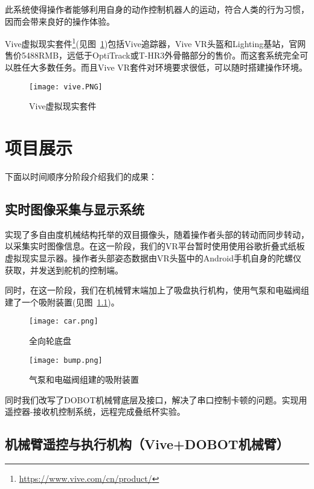此系统使得操作者能够利用自身的动作控制机器人的运动，符合人类的行为习惯，因而会带来良好的操作体验。

Vive虚拟现实套件\footnote{\url{https://www.vive.com/cn/product/}}(见图~\ref{vivekit})包括Vive追踪器，Vive VR头盔和Lighting基站，官网售价5488RMB，远低于OptiTrack或T-HR3外骨骼部分的售价。而这套系统完全可以胜任大多数任务。而且Vive VR套件对环境要求很低，可以随时搭建操作环境。
\begin{figure}[H]
\small
\centering
\texttt{[image: vive.PNG]}
\caption{Vive虚拟现实套件} 
\label{vivekit}
\end{figure}




\chapter{项目展示}
下面以时间顺序分阶段介绍我们的成果：

\section{实时图像采集与显示系统}
实现了多自由度机械结构托举的双目摄像头，随着操作者头部的转动而同步转动，以采集实时图像信息。在这一阶段，我们的VR平台暂时使用使用谷歌折叠式纸板虚拟现实显示器。操作者头部姿态数据由VR头盔中的Android手机自身的陀螺仪获取，并发送到舵机的控制端。

同时，在这一阶段，我们在机械臂末端加上了吸盘执行机构，使用气泵和电磁阀组建了一个吸附装置(见图~\ref{bump})。


\begin{figure}
\begin{minipage}{0.48\textwidth}
  \centering
  \texttt{[image: car.png]}
  \caption{全向轮底盘}
  \label{car}
\end{minipage}\hfill
\begin{minipage}{0.48\textwidth}
  \centering
  \texttt{[image: bump.png]}
  \caption{气泵和电磁阀组建的吸附装置}
  \label{bump}
\end{minipage}
\end{figure}


同时我们改写了DOBOT机械臂底层及接口，解决了串口控制卡顿的问题。实现用遥控器-接收机控制系统，远程完成叠纸杯实验。

\section{机械臂遥控与执行机构（Vive+DOBOT机械臂）}

